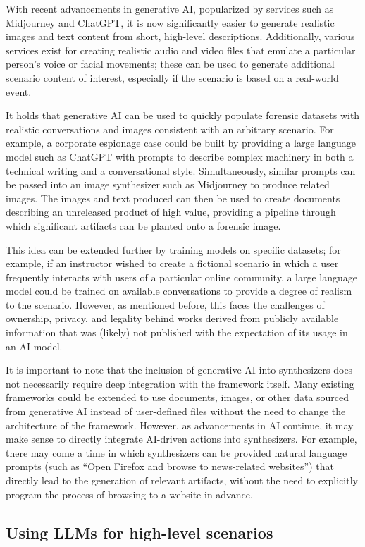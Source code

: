 With recent advancements in generative AI, popularized by services such
as Midjourney and ChatGPT, it is now significantly easier to generate
realistic images and text content from short, high-level descriptions.
Additionally, various services exist for creating realistic audio and
video files that emulate a particular person's voice or facial
movements; these can be used to generate additional scenario content of
interest, especially if the scenario is based on a real-world event.

It holds that generative AI can be used to quickly populate forensic
datasets with realistic conversations and images consistent with an
arbitrary scenario. For example, a corporate espionage case could be
built by providing a large language model such as ChatGPT with prompts
to describe complex machinery in both a technical writing and a
conversational style. Simultaneously, similar prompts can be passed into
an image synthesizer such as Midjourney to produce related images. The
images and text produced can then be used to create documents describing
an unreleased product of high value, providing a pipeline through which
significant artifacts can be planted onto a forensic image.

This idea can be extended further by training models on specific
datasets; for example, if an instructor wished to create a fictional
scenario in which a user frequently interacts with users of a particular
online community, a large language model could be trained on available
conversations to provide a degree of realism to the scenario. However,
as mentioned before, this faces the challenges of ownership, privacy,
and legality behind works derived from publicly available information
that was (likely) not published with the expectation of its usage in an
AI model.

It is important to note that the inclusion of generative AI into
synthesizers does not necessarily require deep integration with the
framework itself. Many existing frameworks could be extended to use
documents, images, or other data sourced from generative AI instead of
user-defined files without the need to change the architecture of the
framework. However, as advancements in AI continue, it may make sense to
directly integrate AI-driven actions into synthesizers. For example,
there may come a time in which synthesizers can be provided natural
language prompts (such as ``Open Firefox and browse to news-related
websites'') that directly lead to the generation of relevant artifacts,
without the need to explicitly program the process of browsing to a
website in advance.

\subsection*{Using LLMs for high-level
scenarios}\label{using-llms-for-high-level-scenarios}
